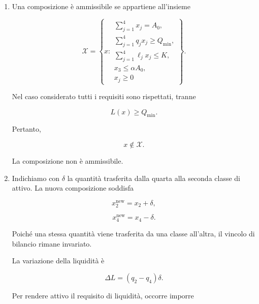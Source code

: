 \begin{enumerate}
\noindent il vincolo \`e rispettato.

Il relativo margine \`e definito da

\[
s_K
=
K-S(x).
\]

Pertanto,

\[
s_K
=
7-6.70
=
0.30.
\]

Per il vincolo di concentrazione, il margine \`e invece

\[
s_C
=
\alpha A_0-x_3.
\]

Poich\'e

\[
\alpha A_0=30,
\]

\noindent si ottiene

\[
s_C
=
30-18
=
12.
\]

Anche il limite di concentrazione \`e quindi rispettato.

\item Una composizione \`e ammissibile se appartiene all'insieme

\[
\mathcal{X}
=
\left\{
x:
\begin{array}{l}
\sum_{j=1}^{4}x_j=A_0,\\
\sum_{j=1}^{4}q_jx_j\geq Q_{\min},\\
\sum_{j=1}^{4}\ell_jx_j\leq K,\\
x_3\leq\alpha A_0,\\
x_j\geq0
\end{array}
\right\}.
\]

Nel caso considerato tutti i requisiti sono rispettati, tranne

\[
L(x)\geq Q_{\min}.
\]

Pertanto,

\[
x\notin\mathcal{X}.
\]

La composizione non \`e ammissibile.

\item Indichiamo con \(\delta\) la quantit\`a trasferita dalla quarta alla
seconda classe di attivo. La nuova composizione soddisfa

\[
x_2^{\mathrm{new}}
=
x_2+\delta,
\]

\[
x_4^{\mathrm{new}}
=
x_4-\delta.
\]

Poich\'e una stessa quantit\`a viene trasferita da una classe all'altra, il
vincolo di bilancio rimane invariato.

La variazione della liquidit\`a \`e

\[
\Delta L
=
(q_2-q_4)\delta.
\]

Per rendere attivo il requisito di liquidit\`a, occorre imporre


\end{enumerate}
